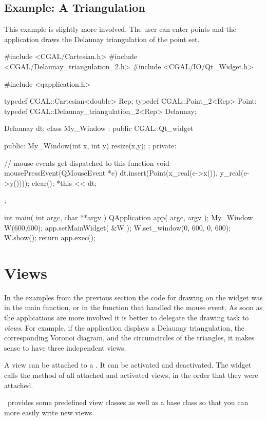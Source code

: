 \subsection{Example: A Triangulation}

This example is slightly more involved. The user can enter points and the application
draws the Delaunay triangulation of the point set. 

\begin{ccExampleCode}
#include <CGAL/Cartesian.h>
#include <CGAL/Delaunay_triangulation_2.h>
#include <CGAL/IO/Qt_Widget.h>

#include <qapplication.h>

typedef CGAL::Cartesian<double>		    Rep;
typedef CGAL::Point_2<Rep>		    Point;
typedef CGAL::Delaunay_triangulation_2<Rep> Delaunay;

Delaunay dt;
class My_Window : public CGAL::Qt_widget {
public:
  My_Window(int x, int y){ resize(x,y); };
private:
  
  // mouse events get dispatched to this function
  void mousePressEvent(QMouseEvent *e)
  {
    dt.insert(Point(x_real(e->x()), y_real(e->y())));
    clear();
    *this << dt;
  }
};

int main( int argc, char **argv )
{
    QApplication app( argc, argv );
    My_Window W(600,600);
    app.setMainWidget( &W );
    W.set_window(0, 600, 0, 600);
    W.show();
    return app.exec();
}
\end{ccExampleCode}



\section{Views}
\label{Qt_widget_views}

In the examples from the previous section the code for drawing on the
widget was in the main function, or in the function that handled the
mouse event.  As soon as the applications are more involved it is
better to delegate the drawing task to {\em views}. For example, if
the application displays a Delaunay triangulation, the corresponding
Voronoi diagram, and the circumcircles of the triangles, it makes
sense to have three independent views.

A view can be attached to a . It can be activated and
deactivated. The widget calls the method  of all
attached and activated views, in the order that they were attached.

\cgal\ provides some predefined view classes as well as a base class
so that you can more easily write new views.


